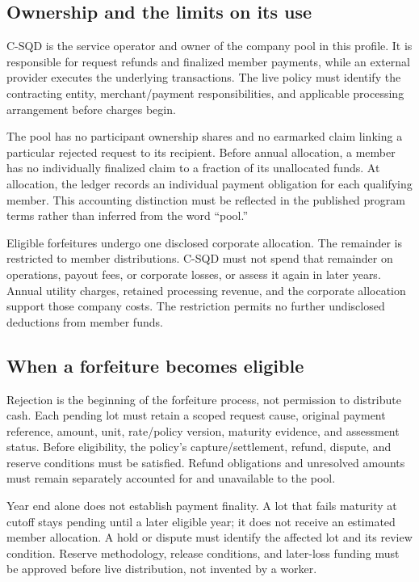 \documentclass[11pt]{article}
\begin{document}
\subsection{Ownership and the limits on its use}

C-SQD is the service operator and owner of the company pool in this profile.
It is responsible for request refunds and finalized member payments, while an
external provider executes the underlying transactions. The live policy must
identify the contracting entity, merchant/payment responsibilities, and applicable
processing arrangement before charges begin.

The pool has no participant ownership shares and no earmarked claim linking a
particular rejected request to its recipient. Before annual allocation, a
member has no individually finalized claim to a fraction of its unallocated
funds. At allocation, the ledger records an individual payment obligation for
each qualifying member. This accounting distinction must be reflected in the
published program terms rather than inferred from the word ``pool.''

Eligible forfeitures undergo one disclosed corporate allocation. The remainder
is restricted to member distributions. C-SQD must not spend that remainder on
operations, payout fees, or corporate losses, or assess it again in later
years. Annual utility charges, retained processing revenue, and the corporate
allocation support those company costs. The restriction permits no further
undisclosed deductions from member funds.

\subsection{When a forfeiture becomes eligible}

Rejection is the beginning of the forfeiture process, not permission to distribute
cash. Each pending lot must retain a scoped request cause, original payment
reference, amount, unit, rate/policy version, maturity evidence, and assessment
status. Before eligibility, the policy's capture/settlement, refund, dispute,
and reserve conditions must be satisfied. Refund obligations and unresolved
amounts must remain separately accounted for and unavailable to the pool.

Year end alone does not establish payment finality. A lot that fails maturity
at cutoff stays pending until a later eligible year; it does not receive an
estimated member allocation. A hold or dispute must identify the affected lot
and its review condition. Reserve methodology, release conditions, and later-loss
funding must be approved before live distribution, not invented by a worker.
\end{document}
